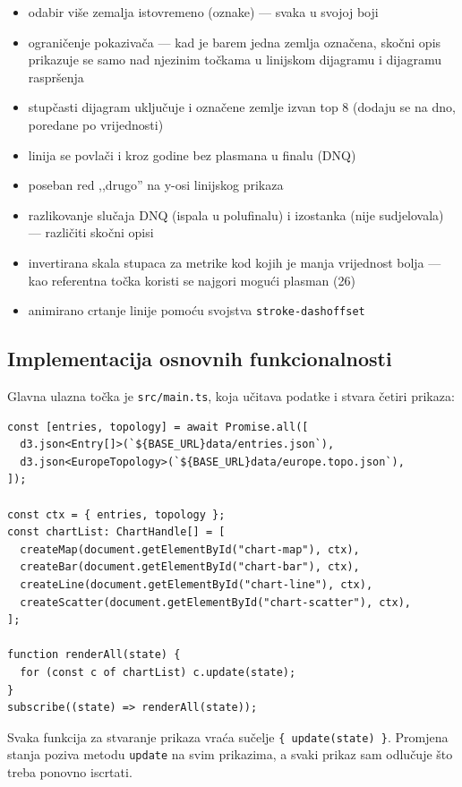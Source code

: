\documentclass[a4paper,11pt]{article}
\begin{document}
\begin{itemize}
  \item odabir više zemalja istovremeno (oznake) --- svaka u svojoj boji
  \item ograničenje pokazivača --- kad je barem jedna zemlja označena, skočni opis prikazuje se samo nad njezinim točkama u linijskom dijagramu i dijagramu raspršenja
  \item stupčasti dijagram uključuje i označene zemlje izvan top 8 (dodaju se na dno, poredane po vrijednosti)
  \item linija se povlači i kroz godine bez plasmana u finalu (DNQ)
  \item poseban red ,,drugo'' na y-osi linijskog prikaza
  \item razlikovanje slučaja DNQ (ispala u polufinalu) i izostanka (nije sudjelovala) --- različiti skočni opisi
  \item invertirana skala stupaca za metrike kod kojih je manja vrijednost bolja --- kao referentna točka koristi se najgori mogući plasman (26)
  \item animirano crtanje linije pomoću svojstva \texttt{stroke-dashoffset}
\end{itemize}

\subsection{Implementacija osnovnih funkcionalnosti}

Glavna ulazna točka je \texttt{src/main.ts}, koja učitava podatke i stvara četiri prikaza:

\begin{lstlisting}
const [entries, topology] = await Promise.all([
  d3.json<Entry[]>(`${BASE_URL}data/entries.json`),
  d3.json<EuropeTopology>(`${BASE_URL}data/europe.topo.json`),
]);

const ctx = { entries, topology };
const chartList: ChartHandle[] = [
  createMap(document.getElementById("chart-map"), ctx),
  createBar(document.getElementById("chart-bar"), ctx),
  createLine(document.getElementById("chart-line"), ctx),
  createScatter(document.getElementById("chart-scatter"), ctx),
];

function renderAll(state) {
  for (const c of chartList) c.update(state);
}
subscribe((state) => renderAll(state));
\end{lstlisting}

Svaka funkcija za stvaranje prikaza vraća sučelje \texttt{\{ update(state) \}}. Promjena stanja poziva metodu \texttt{update} na svim prikazima, a svaki prikaz sam odlučuje što treba ponovno iscrtati.
\end{document}

